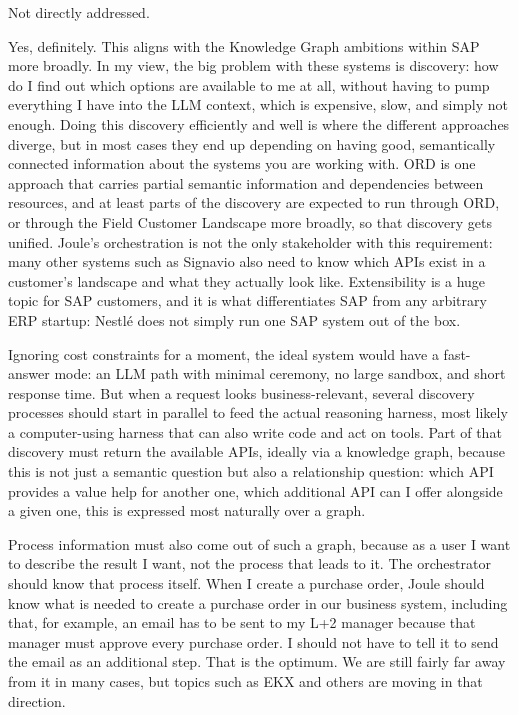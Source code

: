 \medskip{}

Not directly addressed.

\medskip{}

Yes, definitely. This aligns with the Knowledge Graph ambitions within SAP more broadly. In my view, the big problem with these systems is discovery: how do I find out which options are available to me at all, without having to pump everything I have into the LLM context, which is expensive, slow, and simply not enough. Doing this discovery efficiently and well is where the different approaches diverge, but in most cases they end up depending on having good, semantically connected information about the systems you are working with. ORD is one approach that carries partial semantic information and dependencies between resources, and at least parts of the discovery are expected to run through ORD, or through the Field Customer Landscape more broadly, so that discovery gets unified. Joule's orchestration is not the only stakeholder with this requirement: many other systems such as Signavio also need to know which APIs exist in a customer's landscape and what they actually look like. Extensibility is a huge topic for SAP customers, and it is what differentiates SAP from any arbitrary ERP startup: Nestl{\'e} does not simply run one SAP system out of the box.

\medskip{}

Ignoring cost constraints for a moment, the ideal system would have a fast-answer mode: an LLM path with minimal ceremony, no large sandbox, and short response time. But when a request looks business-relevant, several discovery processes should start in parallel to feed the actual reasoning harness, most likely a computer-using harness that can also write code and act on tools. Part of that discovery must return the available APIs, ideally via a knowledge graph, because this is not just a semantic question but also a relationship question: which API provides a value help for another one, which additional API can I offer alongside a given one, this is expressed most naturally over a graph.

Process information must also come out of such a graph, because as a user I want to describe the result I want, not the process that leads to it. The orchestrator should know that process itself. When I create a purchase order, Joule should know what is needed to create a purchase order in our business system, including that, for example, an email has to be sent to my L+2 manager because that manager must approve every purchase order. I should not have to tell it to send the email as an additional step. That is the optimum. We are still fairly far away from it in many cases, but topics such as EKX and others are moving in that direction.

